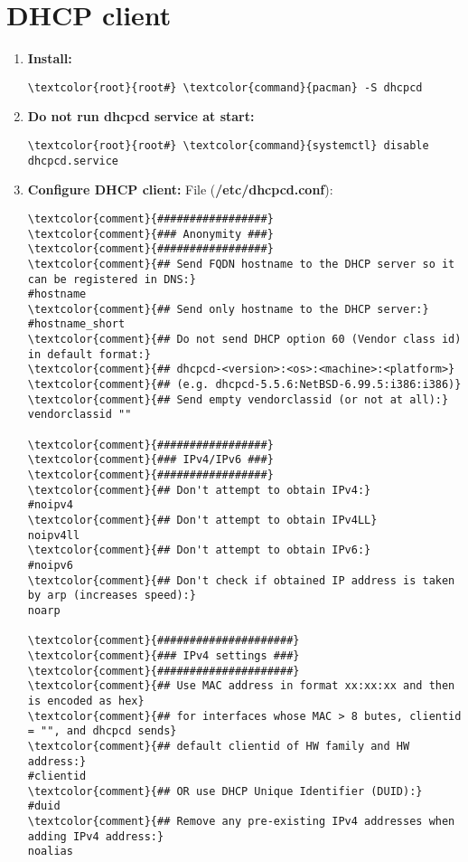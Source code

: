 \documentclass[10pt, a4paper, onecolumn, openany]{book} %
\begin{document}
\section{DHCP client}
\begin{enumerate}
    \item \textbf{Install:}
\begin{Verbatim}[commandchars=\\\{\}]
\textcolor{root}{root#} \textcolor{command}{pacman} -S dhcpcd
\end{Verbatim} 
    \item \textbf{Do not run dhcpcd service at start:}
\begin{Verbatim}[commandchars=\\\{\}]
\textcolor{root}{root#} \textcolor{command}{systemctl} disable dhcpcd.service
\end{Verbatim} 
    \item \textbf{Configure DHCP client:}
File (\textbf{\textcolor{file}{/etc/dhcpcd.conf}}):
\begin{Verbatim}[commandchars=\\\{\}]
\textcolor{comment}{#################}
\textcolor{comment}{### Anonymity ###}
\textcolor{comment}{#################}
\textcolor{comment}{## Send FQDN hostname to the DHCP server so it can be registered in DNS:}
#hostname
\textcolor{comment}{## Send only hostname to the DHCP server:}
#hostname_short
\textcolor{comment}{## Do not send DHCP option 60 (Vendor class id) in default format:}
\textcolor{comment}{## dhcpcd-<version>:<os>:<machine>:<platform>} 
\textcolor{comment}{## (e.g. dhcpcd-5.5.6:NetBSD-6.99.5:i386:i386)}
\textcolor{comment}{## Send empty vendorclassid (or not at all):}
vendorclassid ""

\textcolor{comment}{#################}
\textcolor{comment}{### IPv4/IPv6 ###}
\textcolor{comment}{#################}
\textcolor{comment}{## Don't attempt to obtain IPv4:}
#noipv4
\textcolor{comment}{## Don't attempt to obtain IPv4LL}
noipv4ll
\textcolor{comment}{## Don't attempt to obtain IPv6:}
#noipv6
\textcolor{comment}{## Don't check if obtained IP address is taken by arp (increases speed):}
noarp

\textcolor{comment}{#####################}
\textcolor{comment}{### IPv4 settings ###}
\textcolor{comment}{#####################}
\textcolor{comment}{## Use MAC address in format xx:xx:xx and then is encoded as hex}
\textcolor{comment}{## for interfaces whose MAC > 8 butes, clientid = "", and dhcpcd sends}
\textcolor{comment}{## default clientid of HW family and HW address:}
#clientid
\textcolor{comment}{## OR use DHCP Unique Identifier (DUID):}
#duid
\textcolor{comment}{## Remove any pre-existing IPv4 addresses when adding IPv4 address:}
noalias


\end{Verbatim}
\end{enumerate}
\end{document}
